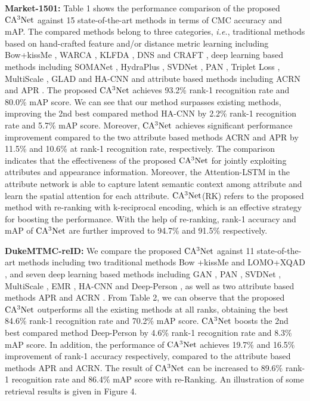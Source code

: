 \documentclass[sigconf]{acmart}
\begin{document}
\begin{table}[htbp]
\end{table}\textbf{Market-1501:} Table 1 shows the performance comparison of the proposed $\rm CA^3Net$ against 15 state-of-the-art methods in terms of CMC accuracy and mAP. The compared methods belong to three categories, \textit{i.e.}, traditional methods based on hand-crafted feature and/or distance metric learning including Bow+kissMe \cite{17}, WARCA \cite{24}, KLFDA \cite{23}, DNS \cite{22} and CRAFT \cite{21}, deep learning based methods including SOMANet \cite{25}, HydraPlus \cite{27}, SVDNet \cite{26}, PAN \cite{28}, Triplet Loss \cite{29}, MultiScale \cite{30}, GLAD \cite{31} and HA-CNN \cite{7} and attribute based methods including ACRN \cite{11} and APR \cite{12}. The proposed $\rm CA^3Net$ achieves 93.2\% rank-1 recognition rate and 80.0\% mAP score. We can see that our method surpasses existing methods, improving the 2nd best compared method HA-CNN by 2.2\% rank-1 recognition rate and 5.7\% mAP score. Moreover, $\rm CA^3Net$ achieves significant performance improvement compared to the two attribute based methods ACRN and APR by 11.5\% and 10.6\% at rank-1 recognition rate, respectively. The comparison indicates that the effectiveness of the proposed $\rm CA^3Net$ for jointly exploiting attributes and appearance information. Moreover, the Attention-LSTM in the attribute network is able to capture latent semantic context among attribute and learn the spatial attention for each attribute. $\rm CA^3Net$(RK) refers to the proposed method with re-ranking \cite{38} with k-reciprocal encoding, which is an effective strategy for boosting the performance. With the help of re-ranking, rank-1 accuracy and mAP of $\rm CA^3Net$ are further improved to 94.7\% and 91.5\% respectively.

\textbf{DukeMTMC-reID:} We compare the proposed $\rm CA^3Net$ against 11 state-of-the-art methods including two traditional methods Bow
+kissMe \cite{17} and LOMO+XQAD \cite{24}, and seven deep learning based methods including GAN \cite{18}, PAN \cite{28}, SVDNet \cite{26}, MultiScale \cite{30}, EMR \cite{36}, HA-CNN \cite{7} and Deep-Person \cite{37}, as well as two attribute based methods APR \cite{12} and  ACRN \cite{11}. From Table 2, we can observe that the proposed $\rm CA^3Net$ outperforms all the existing methods at all ranks, obtaining the best 84.6\% rank-1 recognition rate and 70.2\% mAP score. $\rm CA^3Net$ boosts the 2nd best compared method Deep-Person by 4.6\% rank-1 recognition rate and 8.3\% mAP score. In addition, the performance of $\rm CA^3Net$ achieves 19.7\% and 16.5\% improvement of rank-1 accuracy respectively, compared to the attribute based methods APR and ACRN. The result of $\rm CA^3Net$ can be increased to 89.6\% rank-1 recognition rate and 86.4\% mAP score with re-Ranking. An illustration of some retrieval results is given in Figure 4.
\end{document}
